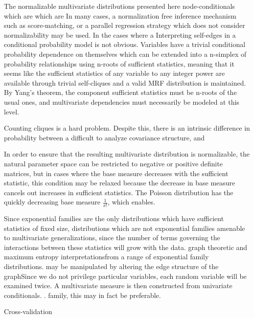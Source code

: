 \documentclass{samkoelleprelimworking}
\begin{document}
 The normalizable multivariate distributions presented here node-conditionals which are  which are In many cases, a normalization free inference mechanism such as score-matching, or a parallel regression strategy which does not consider normalizability may be used.  In the cases where a 
 Interpreting self-edges in a conditional probability model is not obvious.  Variables have a trivial conditional probability dependence on themselves which can be extended into a n-simplex of probability relationships using n-roots of sufficient statistics, meaning that it seems like the sufficient statistics of any variable to any integer power are available through trivial self-cliques and a valid MRF distribution is maintained.  By Yang's theorem, the component sufficient statistics must be n-roots of the usual ones, and multivariate dependencies must necessarily be modeled at this level.  

Counting cliques is a hard problem.  Despite this, there is an intrinsic difference in probability between a difficult to analyze covariance structure, and 

 In order to ensure that the resulting multivariate distribution is normalizable, the natural parameter space can be restricted to negative or positive definite matrices, but in cases where the base measure decreases with the sufficient statistic, this condition may be relaxed because the decrease in base measure cancels out increases in sufficient statistics.  The Poisson distribution has the quickly decreasing base measure $\frac{1}{x!}$, which enables.
 
Since exponential families are the only distributions which have sufficient statistics of fixed size, distributions which are not exponential families amenable to multivariate generalizations, since the number of terms governing the interactions between these statistics will grow with the data.  
graph theoretic and maximum entropy interpretationsfrom a range of exponential family distributions.  may be manipulated by altering the edge structure of the graphSince we do not privilege particular variables, each random variable will be examined twice.  A multivariate measure is then constructed from univariate conditionals.  .   family, this may in fact be preferable.  
 

Cross-validation
  
   
\end{document}
